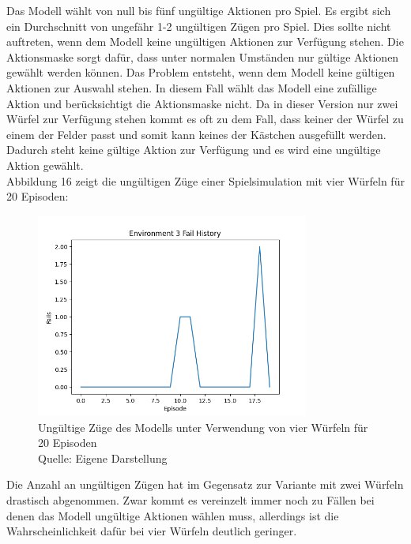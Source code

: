 Das Modell wählt von null bis fünf ungültige Aktionen pro Spiel. Es ergibt sich ein Durchschnitt von ungefähr 1-2 ungültigen Zügen pro Spiel. Dies sollte nicht auftreten, wenn dem Modell keine ungültigen Aktionen zur Verfügung stehen. Die Aktionsmaske sorgt dafür, dass unter normalen Umständen nur gültige Aktionen gewählt werden können. Das Problem entsteht, wenn dem Modell keine gültigen Aktionen zur Auswahl stehen. In diesem Fall wählt das Modell eine zufällige Aktion und berücksichtigt die Aktionsmaske nicht. Da in dieser Version nur zwei Würfel zur Verfügung stehen kommt es oft zu dem Fall, dass keiner der Würfel zu einem der Felder passt und somit kann keines der Kästchen ausgefüllt werden. Dadurch steht keine gültige Aktion zur Verfügung und es wird eine ungültige Aktion gewählt.\\

Abbildung 16 zeigt die ungültigen Züge einer Spielsimulation mit vier Würfeln für 20 Episoden:
\nopagebreak
\begin{figure}[H]
	\centering
	\includegraphics[width=0.8\textwidth]{Bilder/failswithfourdice} 
	\caption[Ungültige Züge des Modells unter Verwendung von vier Würfeln für 20 Episoden]{Ungültige Züge des Modells unter Verwendung von vier Würfeln für 20 Episoden\\ Quelle: Eigene Darstellung}
\end{figure}

Die Anzahl an ungültigen Zügen hat im Gegensatz zur Variante mit zwei Würfeln drastisch abgenommen. Zwar kommt es vereinzelt immer noch zu Fällen bei denen das Modell ungültige Aktionen wählen muss, allerdings ist die Wahrscheinlichkeit dafür bei vier Würfeln deutlich geringer.
